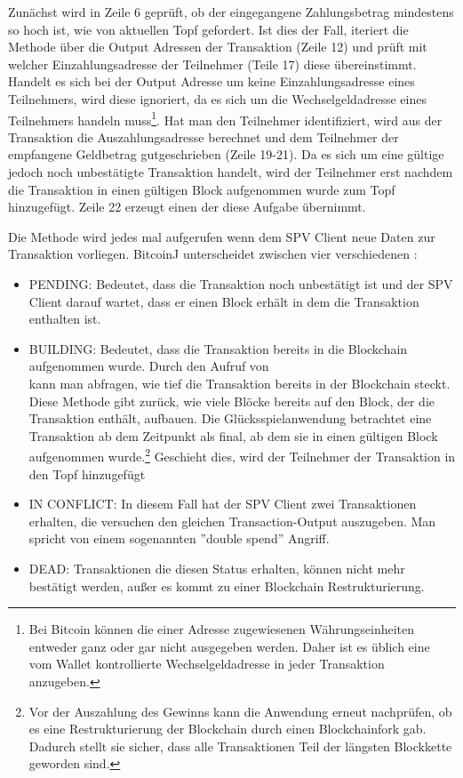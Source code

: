 
Zunächst wird in Zeile 6 geprüft, ob der eingegangene Zahlungsbetrag mindestens so hoch ist, wie von aktuellen Topf gefordert. Ist dies der Fall, iteriert die Methode über die Output Adressen der Transaktion (Zeile 12) und prüft mit welcher Einzahlungsadresse der Teilnehmer (Teile 17) diese übereinstimmt. Handelt es sich bei der Output Adresse um keine Einzahlungsadresse eines Teilnehmers, wird diese ignoriert, da es sich um die Wechselgeldadresse eines Teilnehmers handeln muss\footnote{Bei Bitcoin können die einer Adresse zugewiesenen Währungseinheiten entweder ganz oder gar nicht ausgegeben werden. Daher ist es üblich eine vom Wallet kontrollierte Wechselgeldadresse in jeder Transaktion anzugeben.}. Hat man den Teilnehmer identifiziert, wird aus der Transaktion die Auszahlungsadresse berechnet und dem Teilnehmer der empfangene Geldbetrag gutgeschrieben (Zeile 19-21). Da es sich um eine gültige jedoch noch unbestätigte Transaktion handelt, wird der Teilnehmer erst nachdem die Transaktion in einen gültigen Block aufgenommen wurde zum Topf hinzugefügt. Zeile 22 erzeugt einen  der diese Aufgabe übernimmt.


Die  Methode wird jedes mal aufgerufen wenn dem SPV Client neue Daten zur Transaktion vorliegen. BitcoinJ unterscheidet zwischen vier verschiedenen :
\begin{itemize}
\item PENDING: Bedeutet, dass die Transaktion noch unbestätigt ist und der SPV Client darauf wartet, dass er einen Block erhält in dem die Transaktion enthalten ist.
\item BUILDING: Bedeutet, dass die Transaktion bereits in die Blockchain aufgenommen wurde. Durch den Aufruf von\\  kann man abfragen, wie tief die Transaktion bereits in der Blockchain steckt. Diese Methode gibt zurück, wie viele Blöcke bereits auf den Block, der die Transaktion enthält, aufbauen. Die Glücksspielanwendung betrachtet eine Transaktion ab dem Zeitpunkt als final, ab dem sie in einen gültigen Block aufgenommen wurde.\footnote{Vor der Auszahlung des Gewinns kann die Anwendung erneut nachprüfen, ob es eine Restrukturierung der Blockchain durch einen Blockchainfork gab. Dadurch stellt sie sicher, dass alle Transaktionen Teil der längsten Blockkette geworden sind.} Geschieht dies, wird der Teilnehmer der Transaktion in den Topf hinzugefügt
\item IN CONFLICT: In diesem Fall hat der SPV Client zwei Transaktionen erhalten, die versuchen den gleichen Transaction-Output auszugeben. Man spricht von einem sogenannten ''double spend'' Angriff. 
\item DEAD: Transaktionen die diesen Status erhalten, können nicht mehr bestätigt werden, außer es kommt zu einer Blockchain Restrukturierung.
\end{itemize}

